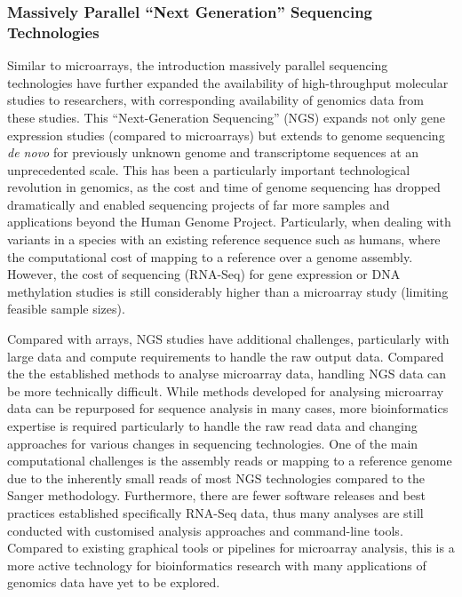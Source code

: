 \subsubsection{Massively Parallel ``Next Generation'' Sequencing Technologies}
Similar to microarrays, the introduction massively parallel sequencing technologies have further expanded the availability of high-throughput molecular studies to researchers, with corresponding availability of genomics data from these studies. This ``Next-Generation Sequencing'' (NGS) expands not only gene expression studies (compared to microarrays) but extends to genome sequencing \textit{de novo} for previously unknown genome and transcriptome sequences at an unprecedented scale. This has been a particularly important technological revolution in genomics, as the cost and time of genome sequencing has dropped dramatically and enabled sequencing projects of far more samples and applications beyond the Human Genome Project. Particularly, when dealing with variants in a species with an existing reference sequence such as humans, where the computational cost of mapping to a reference over a genome assembly. However, the cost of sequencing (RNA-Seq) for gene expression or DNA methylation studies is still considerably higher than a microarray study (limiting feasible sample sizes).

Compared with arrays, NGS studies have additional challenges, particularly with large data and compute requirements to handle the raw output data. Compared the the established methods to analyse microarray data, handling NGS data can be more technically difficult. While methods developed for analysing microarray data can be repurposed for sequence analysis in many cases, more bioinformatics expertise is required particularly to handle the raw read data and changing approaches for various changes in sequencing technologies. One of the main computational challenges is the assembly reads or mapping to a reference genome due to the inherently small reads of most NGS technologies compared to the Sanger methodology. Furthermore, there are fewer software releases and best practices established specifically RNA-Seq data, thus many analyses are still conducted with customised analysis approaches and command-line tools. Compared to existing graphical tools or pipelines for microarray analysis, this is a more active technology for bioinformatics research with many applications of genomics data have yet to be explored.

